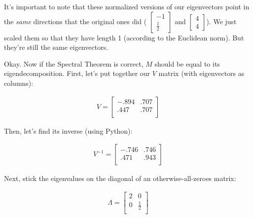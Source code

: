 It's important to note that these normalized versions of our eigenvectors point
in the \textit{same} directions that the original ones did ({\footnotesize
$\begin{bmatrix} -1 \\ \frac{1}{2} \end{bmatrix}$} and {\footnotesize
$\begin{bmatrix} 4 \\ 4 \end{bmatrix}$}). We just scaled them so that they have
length 1 (according to the Euclidean norm). But they're still the same
eigenvectors.

\medskip

Okay. Now if the Spectral Theorem is correct, $M$ should be equal to its
eigendecomposition. First, let's put together our $V$ matrix (with eigenvectors
as columns):

\label{mmatrixST}

\vspace{-.15in}
\begin{align*}
V =
\begin{bmatrix}
-.894 & .707 \\
.447 & .707 \\
\end{bmatrix}
\end{align*}
\vspace{-.15in}

Then, let's find its inverse (using Python):

\vspace{-.15in}
\begin{align*}
V^{-1} =
\begin{bmatrix}
-.746 & .746 \\
.471 & .943 \\
\end{bmatrix}
\end{align*}
\vspace{-.15in}

Next, stick the eigenvalues on the diagonal of an otherwise-all-zeroes matrix:

\vspace{-.15in}
\begin{align*}
\Lambda =
\begin{bmatrix}
2 & 0 \\
0 & \frac{1}{2} \\
\end{bmatrix}
\end{align*}
\vspace{-.15in}

